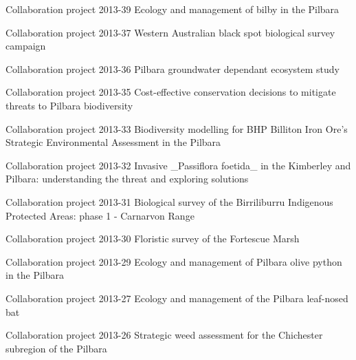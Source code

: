 \documentclass[version=last, paper=a4, DIV=18, usenames, dvipsnames]{scrartcl}
\begin{document}
\begin{longtabu}
  Collaboration project 2013-39 Ecology and management of bilby in the Pilbara \newline  \\ \hline

  Collaboration project 2013-37 Western Australian black spot biological survey campaign \newline  \\ \hline

  Collaboration project 2013-36 Pilbara groundwater dependant ecosystem study \newline  \\ \hline

  Collaboration project 2013-35 Cost-effective conservation decisions to mitigate threats to Pilbara biodiversity \newline  \\ \hline

  Collaboration project 2013-33 Biodiversity modelling for BHP Billiton Iron Ore's Strategic Environmental Assessment in the Pilbara \newline  \\ \hline

  Collaboration project 2013-32 Invasive \_Passiflora foetida\_ in the Kimberley and Pilbara: understanding the threat and exploring solutions \newline  \\ \hline

  Collaboration project 2013-31 Biological survey of the Birriliburru Indigenous Protected Areas: phase 1 - Carnarvon Range \newline  \\ \hline

  Collaboration project 2013-30 Floristic survey of the Fortescue Marsh \newline  \\ \hline

  Collaboration project 2013-29 Ecology and management of Pilbara olive python in the Pilbara \newline  \\ \hline

  Collaboration project 2013-27 Ecology and management of the Pilbara leaf-nosed bat \newline  \\ \hline

  Collaboration project 2013-26 Strategic weed assessment for the Chichester subregion of the Pilbara \newline  \\ \hline


\end{longtabu}
\end{document}
